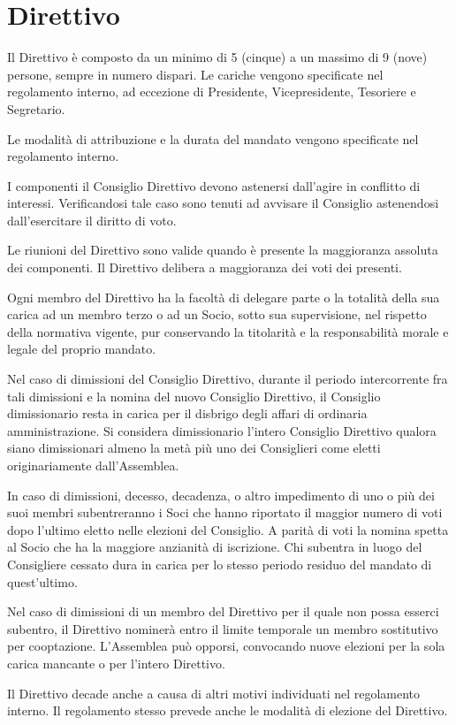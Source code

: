 \documentclass[legalpaper, 11pt]{exam}
\let\tempone\enumerate
\let\temptwo\endenumerate
\renewenvironment{enumerate}{\tempone\addtolength{\itemsep}{-0.45\baselineskip}}{\temptwo}
\begin{document}
{\section{Direttivo}
\begin{enumerate}
 \item Il Direttivo è composto da un minimo di 5 (cinque) a un massimo di 9 (nove) persone, sempre in numero dispari. Le cariche vengono specificate nel regolamento interno, ad eccezione di Presidente, Vicepresidente, Tesoriere e Segretario.
 \item Le modalità di attribuzione e la durata del mandato vengono specificate nel regolamento interno.
 \item I componenti il Consiglio Direttivo devono astenersi dall’agire in conflitto di interessi. Verificandosi tale caso sono tenuti ad avvisare il Consiglio astenendosi dall’esercitare il diritto di voto.
 \item Le riunioni del Direttivo sono valide quando è presente la maggioranza assoluta dei componenti. Il Direttivo delibera a maggioranza dei voti dei presenti.
 \item Ogni membro del Direttivo ha la facoltà di delegare parte o la totalità della sua carica ad un membro terzo o ad un Socio, sotto sua supervisione, nel rispetto della normativa vigente, pur conservando la titolarità e la responsabilità morale e legale del proprio mandato.
 \item Nel caso di dimissioni del Consiglio Direttivo, durante il periodo intercorrente fra tali dimissioni e la nomina del nuovo Consiglio Direttivo, il Consiglio dimissionario resta in carica per il disbrigo degli affari di ordinaria amministrazione. Si considera dimissionario l’intero Consiglio Direttivo qualora siano dimissionari almeno la metà più uno dei Consiglieri come eletti originariamente dall’Assemblea.
 \item In caso di dimissioni, decesso, decadenza, o altro impedimento di uno o più dei suoi membri subentreranno i Soci che hanno riportato il maggior numero di voti dopo l’ultimo eletto nelle elezioni del Consiglio. A parità di voti la nomina spetta al Socio che ha la maggiore anzianità di iscrizione. Chi subentra in luogo del Consigliere cessato dura in carica per lo stesso periodo residuo del mandato di quest'ultimo.
 \item Nel caso di dimissioni di un membro del Direttivo per il quale non possa esserci subentro, il Direttivo nominerà entro il limite temporale un membro sostitutivo per cooptazione. L'Assemblea può opporsi, convocando nuove elezioni per la sola carica mancante o per l'intero Direttivo.
 \item Il Direttivo decade anche a causa di altri motivi individuati nel regolamento interno. Il regolamento stesso prevede anche le modalità di elezione del Direttivo.
\end{enumerate}

}
\end{document}
